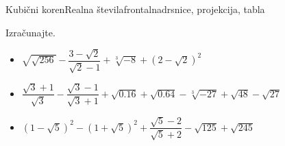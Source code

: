\begin{priprava}{5}{}{Kubični koren}{Realna števila}{frontalna}{drsnice, projekcija, tabla}
\begin{naloga}
\begin{itemize}
                \end{itemize}
            \end{naloga}
        


        
            \begin{naloga}
                Izračunajte.
                \begin{itemize}
                        \item $\sqrt{\sqrt{256}}-\dfrac{3-\sqrt{2}}{\sqrt{2}-1}+\sqrt[3]{-8}+\left(2-\sqrt{2}\right)^2$ 
                        \item $\dfrac{\sqrt{3}+1}{\sqrt{3}}-\dfrac{\sqrt{3}-1}{\sqrt{3}+1}+\sqrt{0.16}+\sqrt{0.64}-\sqrt[3]{-27}+\sqrt{48}-\sqrt{27}$ 
                        \item $\left(1-\sqrt{5}\right)^2-\left(1+\sqrt{5}\right)^2+\dfrac{\sqrt{5}-2}{\sqrt{5}+2}-\sqrt{125}+\sqrt{245}$ 
                \end{itemize}
            \end{naloga}
        

    
\end{priprava}
